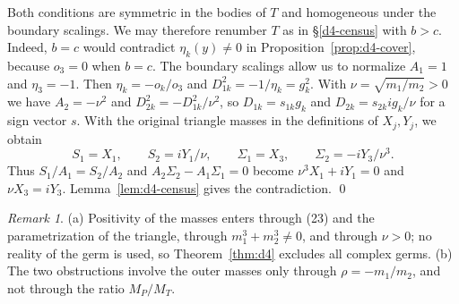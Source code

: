 \documentclass[11pt]{amsart}
\theoremstyle{definition}
\theoremstyle{remark}
\newtheorem{remark}[theorem]{Remark}
\begin{document}
{Both conditions are symmetric in the bodies of $T$ and homogeneous under
the boundary scalings. We may therefore renumber $T$ as in \S\ref{d4-census} with $b>c$.
Indeed, $b=c$ would contradict $\eta_k(y)\ne0$ in Proposition~\ref{prop:d4-cover},
because $o_3=0$ when $b=c$.
The boundary scalings allow us to normalize $A_1=1$ and $\eta_3=-1$.
Then $\eta_k=-o_k/o_3$ and $D_{1k}^2=-1/\eta_k=g_k^2$.
With $\nu=\sqrt{m_1/m_2}>0$ we have $A_2=-\nu^2$ and
$D_{2k}^2=-D_{1k}^2/\nu^2$, so
$D_{1k}=s_{1k}g_k$ and $D_{2k}=s_{2k}ig_k/\nu$ for a sign vector $s$.
With the original triangle masses in the definitions of $X_j,Y_j$, we obtain
\[
 S_1=X_1,\qquad S_2=iY_1/\nu,\qquad
 \Sigma_1=X_3,\qquad \Sigma_2=-iY_3/\nu^3.
\]
Thus $S_1/A_1=S_2/A_2$ and $A_2\Sigma_2-A_1\Sigma_1=0$ become
$\nu^3X_1+iY_1=0$ and $\nu X_3=iY_3$.
Lemma~\ref{lem:d4-census} gives the contradiction. \qed}

\begin{remark}\label{rem:d4-witnesses}
(a) Positivity of the masses enters through (23) and the parametrization of the triangle,
through $m_1^3+m_2^3\ne0$, and through $\nu>0$; no reality of the germ is used, so
Theorem~\ref{thm:d4} excludes all complex germs.
(b) The two obstructions involve the outer masses only through $\rho=-m_1/m_2$, and not through
the ratio $M_P/M_T$.
\end{remark}
\end{document}
